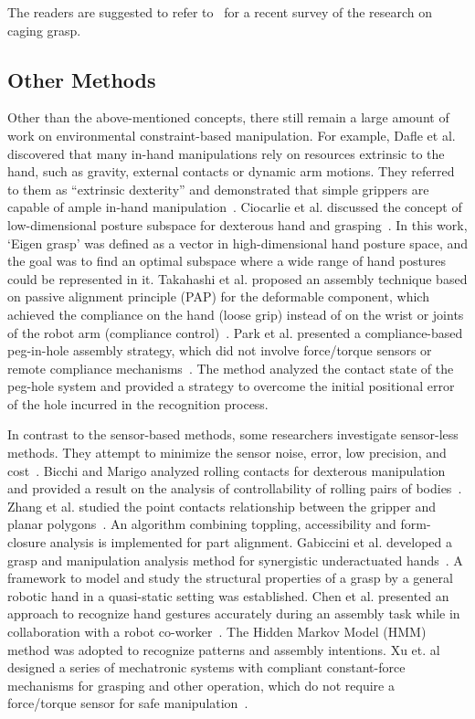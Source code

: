 \documentclass[journal,twoside,web]{ieeecolor}
\begin{document}
The readers are suggested to refer to~\cite{Makita2017} for a recent survey of the research on caging grasp.

\subsection{Other Methods}
\label{subsec:extrinsic}

Other than the above-mentioned concepts, there still remain a large amount of work on environmental constraint-based manipulation.
For example, 
Dafle et al. discovered that many in-hand manipulations rely on resources extrinsic to the hand, such as gravity, external contacts or dynamic arm motions. They referred to them as ``extrinsic dexterity'' and demonstrated that simple grippers are capable of ample in-hand manipulation~\cite{Dafle2014a, Dafle2014b}.
Ciocarlie et al. discussed the concept of low-dimensional posture subspace for dexterous hand and grasping~\cite{Ciocarlie2009}. In this work, `Eigen grasp' was defined as a vector in high-dimensional hand posture space, and the goal was to find an optimal subspace where a wide range of hand postures could be represented in it.
Takahashi et al. proposed an assembly technique based on passive alignment principle (PAP) for the deformable component, which achieved the compliance on the hand (loose grip) instead of on the wrist or joints of the robot arm (compliance control)~\cite{Takahashi2016Passive, Fukukawa2016}.
Park et al. presented a compliance-based peg-in-hole assembly strategy, which did not involve force/torque sensors or remote compliance mechanisms~\cite{Park2017}. The method analyzed the contact state of the peg-hole system and provided a strategy to overcome the initial positional error of the hole incurred in the recognition process.

In contrast to the sensor-based methods, some researchers investigate sensor-less methods. They attempt to minimize the sensor noise, error, low precision, and cost~\cite{Erden2010,Pistillo2011,Yao2018}.
Bicchi and Marigo analyzed rolling contacts for dexterous manipulation and provided a result on the analysis of controllability of rolling pairs of bodies~\cite{Bicchi2000c}.
Zhang et al. studied the point contacts relationship between the gripper and planar polygons~\cite{Zhang2002}. An algorithm combining toppling, accessibility and form-closure analysis is implemented for part alignment.
Gabiccini et al. developed a grasp and manipulation analysis method for synergistic underactuated hands~\cite{Gabiccini2012}. A framework to model and study the structural properties of a grasp by a general robotic hand in a quasi-static setting was established.
Chen et al. presented an approach to recognize hand gestures accurately during an assembly task while in collaboration with a robot co-worker~\cite{Chen2015a}. The Hidden Markov Model (HMM) method was adopted to recognize patterns and assembly intentions.
Xu et. al designed a series of mechatronic systems with compliant constant-force mechanisms for grasping and other operation, which do not require a force/torque sensor for safe manipulation~\cite{Xu2018,Wang2018,Zhang2018}.
\end{document}
